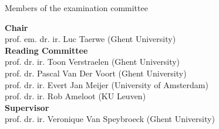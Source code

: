 \cleardoublepage
\thispagestyle{empty}

\vspace*{\fill}
\Large
Members of the examination committee

\vspace{0.5cm}
\normalsize
\textbf{Chair} \\

prof. em. dr. ir. Luc Taerwe (Ghent University)\\

\textbf{Reading Committee} \\  

 prof. dr. ir. Toon Verstraelen (Ghent University)\\
\indent prof. dr. Pascal Van Der Voort (Ghent University) \\
\indent prof. dr. ir. Evert Jan Meijer (University of Amsterdam) \\
\indent prof. dr. ir. Rob Ameloot (KU Leuven)\\



\textbf{Supervisor} \\

\indent prof. dr. ir. Veronique Van Speybroeck (Ghent University)\\

\vspace*{\fill}